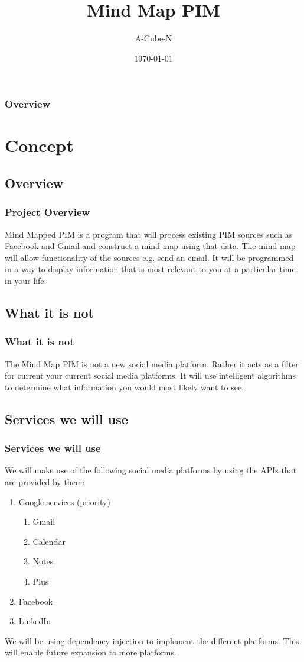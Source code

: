 \documentclass{beamer}
\title[Mind Map PIM]{Mind Map PIM}
\author{A-Cube-N}
\institute[UP]{
	Department of Computer Science, University of Pretoria
}
\date{\today}
\begin{document}
\begin{frame}
	\titlepage
\end{frame}

\begin{frame}
	\frametitle{Overview}
	\tableofcontents
\end{frame}

\section{Concept}
	\subsection{Overview}
		\begin{frame}
		\frametitle{Project Overview}
			Mind Mapped PIM is a program that will process existing PIM sources such as Facebook and Gmail and construct a mind map using that data. 
			The mind map will allow functionality of the sources e.g. send an email. It will be programmed in a way to display information that is most relevant to you at a particular time in your life.
		\end{frame}
	
	\subsection{What it is not}
		\begin{frame}
		\frametitle{What it is not}
			The Mind Map PIM is not a new social media platform. Rather it acts as a filter for current your current social media platforms.  It will use intelligent algorithms to determine what information you would most likely want to see.
		\end{frame}
			
	\subsection{Services we will use}
		\begin{frame}
		\frametitle{Services we will use}
			We will make use of the following social media platforms by using the APIs that are provided by them:
			\begin{enumerate}
				\item Google services (priority)
					\begin{enumerate}
						\item Gmail
						\item Calendar
						\item Notes
						\item Plus
					\end{enumerate}
				\item Facebook
				\item LinkedIn
			\end{enumerate}
			We will be using dependency injection to implement the different platforms. This will enable future expansion to more platforms.
		\end{frame}
		
\end{document}

